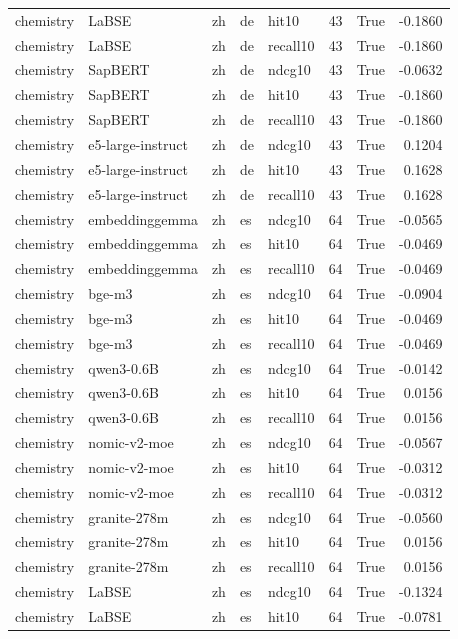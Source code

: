 \begin{tabular}{lllllrrr}
chemistry & LaBSE & zh & de & hit10 & 43 & True & -0.1860 \\
chemistry & LaBSE & zh & de & recall10 & 43 & True & -0.1860 \\
chemistry & SapBERT & zh & de & ndcg10 & 43 & True & -0.0632 \\
chemistry & SapBERT & zh & de & hit10 & 43 & True & -0.1860 \\
chemistry & SapBERT & zh & de & recall10 & 43 & True & -0.1860 \\
chemistry & e5-large-instruct & zh & de & ndcg10 & 43 & True & 0.1204 \\
chemistry & e5-large-instruct & zh & de & hit10 & 43 & True & 0.1628 \\
chemistry & e5-large-instruct & zh & de & recall10 & 43 & True & 0.1628 \\
chemistry & embeddinggemma & zh & es & ndcg10 & 64 & True & -0.0565 \\
chemistry & embeddinggemma & zh & es & hit10 & 64 & True & -0.0469 \\
chemistry & embeddinggemma & zh & es & recall10 & 64 & True & -0.0469 \\
chemistry & bge-m3 & zh & es & ndcg10 & 64 & True & -0.0904 \\
chemistry & bge-m3 & zh & es & hit10 & 64 & True & -0.0469 \\
chemistry & bge-m3 & zh & es & recall10 & 64 & True & -0.0469 \\
chemistry & qwen3-0.6B & zh & es & ndcg10 & 64 & True & -0.0142 \\
chemistry & qwen3-0.6B & zh & es & hit10 & 64 & True & 0.0156 \\
chemistry & qwen3-0.6B & zh & es & recall10 & 64 & True & 0.0156 \\
chemistry & nomic-v2-moe & zh & es & ndcg10 & 64 & True & -0.0567 \\
chemistry & nomic-v2-moe & zh & es & hit10 & 64 & True & -0.0312 \\
chemistry & nomic-v2-moe & zh & es & recall10 & 64 & True & -0.0312 \\
chemistry & granite-278m & zh & es & ndcg10 & 64 & True & -0.0560 \\
chemistry & granite-278m & zh & es & hit10 & 64 & True & 0.0156 \\
chemistry & granite-278m & zh & es & recall10 & 64 & True & 0.0156 \\
chemistry & LaBSE & zh & es & ndcg10 & 64 & True & -0.1324 \\
chemistry & LaBSE & zh & es & hit10 & 64 & True & -0.0781 \\

\end{tabular}
